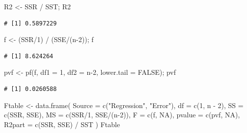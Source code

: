 \documentclass[
  letterpaper,
  DIV=11,
  numbers=noendperiod]{scrreprt}
\newenvironment{Shaded}{\begin{snugshade}}{\end{snugshade}}
\newcommand{\AttributeTok}[1]{\textcolor[rgb]{0.40,0.45,0.13}{#1}}
\newcommand{\ConstantTok}[1]{\textcolor[rgb]{0.56,0.35,0.01}{#1}}
\newcommand{\DecValTok}[1]{\textcolor[rgb]{0.68,0.00,0.00}{#1}}
\newcommand{\FunctionTok}[1]{\textcolor[rgb]{0.28,0.35,0.67}{#1}}
\newcommand{\NormalTok}[1]{\textcolor[rgb]{0.00,0.23,0.31}{#1}}
\newcommand{\OtherTok}[1]{\textcolor[rgb]{0.00,0.23,0.31}{#1}}
\newcommand{\SpecialCharTok}[1]{\textcolor[rgb]{0.37,0.37,0.37}{#1}}
\newcommand{\StringTok}[1]{\textcolor[rgb]{0.13,0.47,0.30}{#1}}
\begin{document}
\begin{Shaded}
\begin{Highlighting}[]
\NormalTok{R2 }\OtherTok{\textless{}{-}}\NormalTok{ SSR }\SpecialCharTok{/}\NormalTok{ SST; R2}
\end{Highlighting}
\end{Shaded}

\begin{verbatim}
# [1] 0.5897229
\end{verbatim}

\begin{Shaded}
\begin{Highlighting}[]
\NormalTok{f  }\OtherTok{\textless{}{-}}\NormalTok{ (SSR}\SpecialCharTok{/}\DecValTok{1}\NormalTok{) }\SpecialCharTok{/}\NormalTok{ (SSE}\SpecialCharTok{/}\NormalTok{(n}\DecValTok{{-}2}\NormalTok{)); f}
\end{Highlighting}
\end{Shaded}

\begin{verbatim}
# [1] 8.624264
\end{verbatim}

\begin{Shaded}
\begin{Highlighting}[]
\NormalTok{pvf }\OtherTok{\textless{}{-}} \FunctionTok{pf}\NormalTok{(f, }\AttributeTok{df1 =} \DecValTok{1}\NormalTok{, }\AttributeTok{df2 =}\NormalTok{ n}\DecValTok{{-}2}\NormalTok{, }\AttributeTok{lower.tail =} \ConstantTok{FALSE}\NormalTok{); pvf}
\end{Highlighting}
\end{Shaded}

\begin{verbatim}
# [1] 0.0260588
\end{verbatim}

\begin{Shaded}
\begin{Highlighting}[]
\NormalTok{Ftable }\OtherTok{\textless{}{-}} \FunctionTok{data.frame}\NormalTok{(}
  \AttributeTok{Source =} \FunctionTok{c}\NormalTok{(}\StringTok{"Regression"}\NormalTok{, }\StringTok{"Error"}\NormalTok{),}
  \AttributeTok{df     =} \FunctionTok{c}\NormalTok{(}\DecValTok{1}\NormalTok{, n }\SpecialCharTok{{-}} \DecValTok{2}\NormalTok{),}
  \AttributeTok{SS     =} \FunctionTok{c}\NormalTok{(SSR, SSE),}
  \AttributeTok{MS     =} \FunctionTok{c}\NormalTok{(SSR}\SpecialCharTok{/}\DecValTok{1}\NormalTok{, SSE}\SpecialCharTok{/}\NormalTok{(n}\DecValTok{{-}2}\NormalTok{)),}
  \AttributeTok{F      =} \FunctionTok{c}\NormalTok{(f, }\ConstantTok{NA}\NormalTok{),}
  \AttributeTok{pvalue =} \FunctionTok{c}\NormalTok{(pvf, }\ConstantTok{NA}\NormalTok{),}
  \AttributeTok{R2part =} \FunctionTok{c}\NormalTok{(SSR, SSE) }\SpecialCharTok{/}\NormalTok{ SST}
\NormalTok{)}
\NormalTok{Ftable}
\end{Highlighting}
\end{Shaded}
\end{document}
